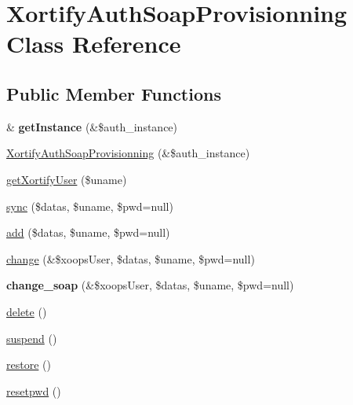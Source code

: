 \hypertarget{class_xortify_auth_soap_provisionning}{\section{Xortify\-Auth\-Soap\-Provisionning Class Reference}
\label{class_xortify_auth_soap_provisionning}
}
\subsection*{Public Member Functions}
\begin{DoxyCompactItemize}
\item 
\hypertarget{class_xortify_auth_soap_provisionning_a11022891c1600965ecbf51f528f0eba4}{\& {\bfseries get\-Instance} (\&\$auth\-\_\-instance)}\label{class_xortify_auth_soap_provisionning_a11022891c1600965ecbf51f528f0eba4}

\item 
\hyperlink{class_xortify_auth_soap_provisionning_ae82db00ac7351537e25b0da9113cdf61}{Xortify\-Auth\-Soap\-Provisionning} (\&\$auth\-\_\-instance)
\item 
\hyperlink{class_xortify_auth_soap_provisionning_aa8c8495edb46b905993bc28cc7223e28}{get\-Xortify\-User} (\$uname)
\item 
\hyperlink{class_xortify_auth_soap_provisionning_a8992fbd11c0850f66a1e200ad683dd52}{sync} (\$datas, \$uname, \$pwd=null)
\item 
\hyperlink{class_xortify_auth_soap_provisionning_aaa12586af8de59456ecd5f7ad84079a9}{add} (\$datas, \$uname, \$pwd=null)
\item 
\hyperlink{class_xortify_auth_soap_provisionning_aad4341c148da9f369812b8a9def59a49}{change} (\&\$xoops\-User, \$datas, \$uname, \$pwd=null)
\item 
\hypertarget{class_xortify_auth_soap_provisionning_ac71150d4f03a84c98e29859de34164cf}{{\bfseries change\-\_\-soap} (\&\$xoops\-User, \$datas, \$uname, \$pwd=null)}\label{class_xortify_auth_soap_provisionning_ac71150d4f03a84c98e29859de34164cf}

\item 
\hyperlink{class_xortify_auth_soap_provisionning_a1909205aecb73eb44b4bd57f786c9590}{delete} ()
\item 
\hyperlink{class_xortify_auth_soap_provisionning_a476a88de2850997735a7600aee1a607d}{suspend} ()
\item 
\hyperlink{class_xortify_auth_soap_provisionning_acb1f6b740653148c7c6a2d1e446faeff}{restore} ()
\item 
\hyperlink{class_xortify_auth_soap_provisionning_adf8a1d6ebcb631cc29f66f66adf45b90}{resetpwd} ()
\end{DoxyCompactItemize}
